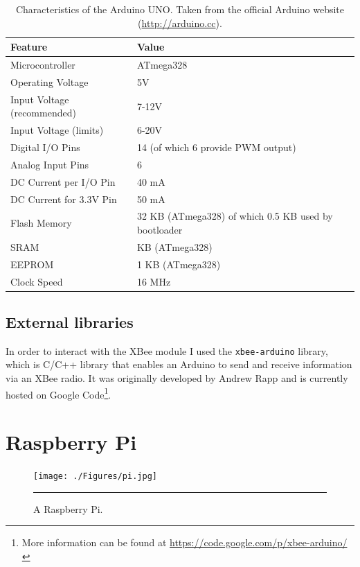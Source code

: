 \begin{table}[ht] 
\centering
\begin{tabular}{l|l}
    Feature     & Value\\
\hline
Microcontroller	& ATmega328\\
Operating Voltage &	5V\\
Input Voltage (recommended) & 7-12V\\
Input Voltage (limits) & 6-20V\\
Digital I/O Pins & 14 (of which 6 provide PWM output)\\
Analog Input Pins & 6\\
DC Current per I/O Pin & 40 mA\\
DC Current for 3.3V Pin & 50 mA\\
Flash Memory & 32 KB (ATmega328) of which 0.5 KB used by bootloader\\
SRAM & KB (ATmega328)\\
EEPROM &	1 KB (ATmega328)\\
Clock Speed &	16 MHz\\
\end{tabular}
\caption[Characteristics of the Arduino UNO]{Characteristics of the Arduino UNO. Taken from the official Arduino website (\url{http://arduino.cc}).}
\label{tab:arduinofeatures}
\end{table}

\subsection{External libraries}
In order to interact with the XBee module I used the \texttt{xbee-arduino} library, which is C/C++ library that enables an Arduino to send and receive information via an XBee\textregistered{} radio. It was originally developed by Andrew Rapp and is currently hosted on Google Code\footnote{More information can be found at \url{https://code.google.com/p/xbee-arduino/}}.


\section{Raspberry Pi}

\begin{figure}[htbp]
    \centering
    \texttt{[image: ./Figures/pi.jpg]}
        \rule{35em}{0.5pt}
        \caption[Raspberry Pi]{A Raspberry Pi.}
    \label{fig:RaspberryPi}
\end{figure}

